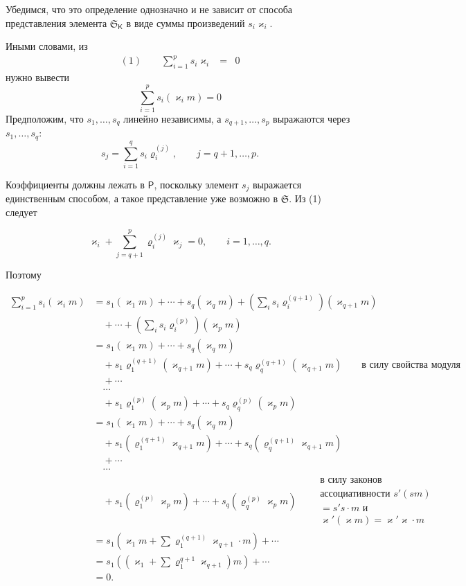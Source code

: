 \documentclass[11pt]{article}
\begin{document}
Убедимся, что это определение однозначно и не зависит от способа представления элемента \(\mathfrak S_{\mathsf K}\) в виде суммы произведений \(s_i\varkappa _i\).

Иными словами, из
\[
\begin{array}{rcl}
(1)\qquad \displaystyle\sum_{i=1}^{p}s_i\varkappa _i&=&0
\end{array}
\]
нужно вывести
\[
\sum_{i=1}^{p}s_i(\varkappa _i m)=0
\]
Предположим, что \(s_1,\ldots,s_q\) линейно независимы, а \(s_{q+1},\ldots,s_p\) выражаются через \(s_1,\ldots,s_q\):
\[
s_j=\sum_{i=1}^{q}s_i\varrho_i^{(j)},\qquad j=q+1,\ldots,p.
\]

Коэффициенты должны лежать в \(\mathsf P\), поскольку элемент \(s_j\) выражается единственным способом, а такое представление уже возможно в \(\mathfrak S\). Из (1) следует

\[
\varkappa _i+\sum_{j=q+1}^{p}\varrho_i^{(j)}\varkappa _j=0,\qquad i=1,\ldots,q.
\]

Поэтому

\[
\begin{aligned}
\sum_{i=1}^{p}s_i(\varkappa _i m)
&=s_1(\varkappa _1m)+\cdots+s_q(\varkappa _qm)
  +\left(\sum_i s_i\varrho_i^{(q+1)}\right)(\varkappa _{q+1}m)\\
&\quad+\cdots+\left(\sum_i s_i\varrho_i^{(p)}\right)(\varkappa _pm)\\
&=s_1(\varkappa _1m)+\cdots+s_q(\varkappa _qm)\\
&\quad+s_1\varrho_1^{(q+1)}(\varkappa _{q+1}m)+\cdots+s_q\varrho_q^{(q+1)}(\varkappa _{q+1}m)
  \qquad\text{в силу свойства модуля}\\
&\quad+\cdots\\
&\quad\cdots\\
&\quad+s_1\varrho_1^{(p)}(\varkappa _pm)+\cdots+s_q\varrho_q^{(p)}(\varkappa _pm)\\
&=s_1(\varkappa _1m)+\cdots+s_q(\varkappa _qm)\\
&\quad+s_1(\varrho_1^{(q+1)}\varkappa _{q+1}m)+\cdots+s_q(\varrho_q^{(q+1)}\varkappa _{q+1}m)\\
&\quad+\cdots\\
&\quad\cdots\\
&\quad+s_1(\varrho_1^{(p)}\varkappa _pm)+\cdots+s_q(\varrho_q^{(p)}\varkappa _pm)
  \qquad\begin{gathered}\text{в силу законов}\\ \text{ассоциативности }s'(sm)\\ =s's\cdot m\text{ и}\\ \varkappa '(\varkappa m)=\varkappa '\varkappa \cdot m\end{gathered}\\
&=s_1\left(\varkappa _1m+\sum\varrho_1^{(q+1)}\varkappa _{q+1}\cdot m\right)+\cdots\\
&=s_1\left(\left(\varkappa _1+\sum\varrho_1^{q+1}\varkappa _{q+1}\right)m\right)+\cdots\\
&=0.
\end{aligned}
\]
\end{document}

